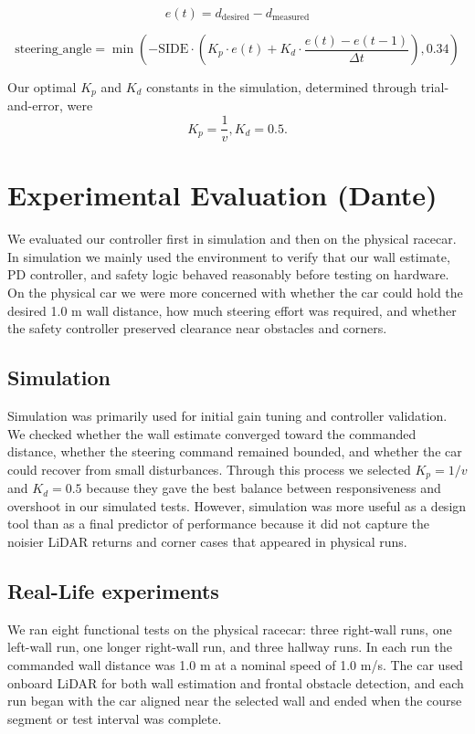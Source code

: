 \documentclass{article}
\begin{document}
$$ e(t) = d_{\text{desired}} - d_{\text{measured}} $$

$$ \text{steering\_angle} = \min \left( -\text{SIDE} \cdot \left( K_p \cdot e(t) + K_d \cdot \frac{e(t) - e(t-1)}{\Delta t} \right) , 0.34 \right) $$

Our optimal $K_p$ and $K_d$ constants in the simulation, determined through trial-and-error, were
$$K_p = \frac{1}{v}, K_d = 0.5.$$

\section{Experimental Evaluation (Dante)}
We evaluated our controller first in simulation and then on the physical racecar. In simulation we mainly used the environment to verify that our wall estimate, PD controller, and safety logic behaved reasonably before testing on hardware. On the physical car we were more concerned with whether the car could hold the desired 1.0 m wall distance, how much steering effort was required, and whether the safety controller preserved clearance near obstacles and corners.

\subsection{Simulation}
Simulation was primarily used for initial gain tuning and controller validation. We checked whether the wall estimate converged toward the commanded distance, whether the steering command remained bounded, and whether the car could recover from small disturbances. Through this process we selected $K_p = 1/v$ and $K_d = 0.5$ because they gave the best balance between responsiveness and overshoot in our simulated tests. However, simulation was more useful as a design tool than as a final predictor of performance because it did not capture the noisier LiDAR returns and corner cases that appeared in physical runs.

\subsection{Real-Life experiments}
We ran eight functional tests on the physical racecar: three right-wall runs, one left-wall run, one longer right-wall run, and three hallway runs. In each run the commanded wall distance was 1.0 m at a nominal speed of 1.0 m/s. The car used onboard LiDAR for both wall estimation and frontal obstacle detection, and each run began with the car aligned near the selected wall and ended when the course segment or test interval was complete.\\
\end{document}
